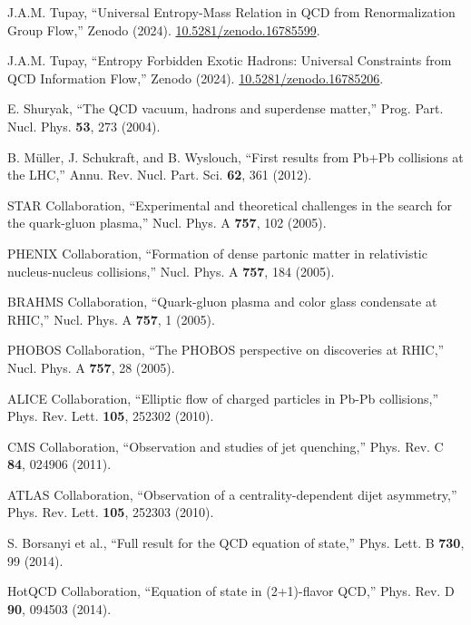 \documentclass[12pt,a4paper]{article}
\begin{document}
\begin{thebibliography}{99}

J.A.M. Tupay, ``Universal Entropy-Mass Relation in QCD from Renormalization Group Flow,'' Zenodo (2024). \href{https://doi.org/10.5281/zenodo.16785599}{10.5281/zenodo.16785599}.

J.A.M. Tupay, ``Entropy Forbidden Exotic Hadrons: Universal Constraints from QCD Information Flow,'' Zenodo (2024). \href{https://doi.org/10.5281/zenodo.16785206}{10.5281/zenodo.16785206}.

E. Shuryak, ``The QCD vacuum, hadrons and superdense matter,'' Prog. Part. Nucl. Phys. \textbf{53}, 273 (2004).

B. Müller, J. Schukraft, and B. Wyslouch, ``First results from Pb+Pb collisions at the LHC,'' Annu. Rev. Nucl. Part. Sci. \textbf{62}, 361 (2012).

STAR Collaboration, ``Experimental and theoretical challenges in the search for the quark-gluon plasma,'' Nucl. Phys. A \textbf{757}, 102 (2005).

PHENIX Collaboration, ``Formation of dense partonic matter in relativistic nucleus-nucleus collisions,'' Nucl. Phys. A \textbf{757}, 184 (2005).

BRAHMS Collaboration, ``Quark-gluon plasma and color glass condensate at RHIC,'' Nucl. Phys. A \textbf{757}, 1 (2005).

PHOBOS Collaboration, ``The PHOBOS perspective on discoveries at RHIC,'' Nucl. Phys. A \textbf{757}, 28 (2005).

ALICE Collaboration, ``Elliptic flow of charged particles in Pb-Pb collisions,'' Phys. Rev. Lett. \textbf{105}, 252302 (2010).

CMS Collaboration, ``Observation and studies of jet quenching,'' Phys. Rev. C \textbf{84}, 024906 (2011).

ATLAS Collaboration, ``Observation of a centrality-dependent dijet asymmetry,'' Phys. Rev. Lett. \textbf{105}, 252303 (2010).

S. Borsanyi et al., ``Full result for the QCD equation of state,'' Phys. Lett. B \textbf{730}, 99 (2014).

HotQCD Collaboration, ``Equation of state in (2+1)-flavor QCD,'' Phys. Rev. D \textbf{90}, 094503 (2014).


\end{thebibliography}
\end{document}
